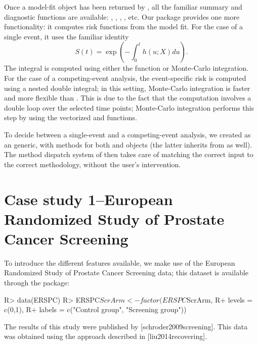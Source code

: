\documentclass[article]{jss}
\begin{document}
Once a model-fit object has been returned by , all
the familiar summary and diagnostic functions are available:
, , , , etc. Our
package provides one more functionality: it computes risk functions from
the model fit. For the case of a single event, it uses the familiar
identity \[S(t) = \exp\left(-\int_0^t h(u;X) du\right).\] The integral
is computed using either the  function or
Monte-Carlo integration. For the case of a competing-event analysis, the
event-specific risk is computed using a nested double integral; in this
setting, Monte-Carlo integration is faster and more flexible than
. This is due to the fact that the computation
involves a double loop over the selected time points; Monte-Carlo
integration performs this step by using the vectorized 
and  functions.

To decide between a single-event and a competing-event analysis, we
created  as an  generic, with methods for
both  and  objects (the latter inherits from
 as well). The method dispatch system of  then
takes care of matching the correct input to the correct methodology,
without the user's intervention.

\section{Case study 1--European Randomized Study of Prostate Cancer
Screening}\label{case-study-1european-randomized-study-of-prostate-cancer-screening}

To introduce the different features available, we make use of the
European Randomized Study of Prostate Cancer Screening data; this
dataset is available through the  package:

\begin{CodeChunk}

\begin{CodeInput}
R> data(ERSPC)
R> ERSPC$ScrArm <- factor(ERSPC$ScrArm, 
R+                        levels = c(0,1), 
R+                        labels = c("Control group", "Screening group"))
\end{CodeInput}
\end{CodeChunk}

The results of this study were published by {[}schroder2009screening{]}.
This data was obtained using the approach described in
{[}liu2014recovering{]}.
\end{document}
